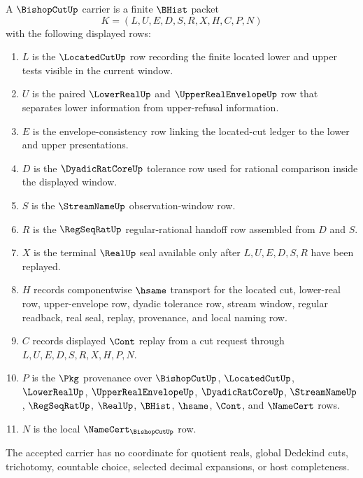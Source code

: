 \begin{definition}
\label{def:bishop-cut-carrier}
A $\BishopCutUp$ carrier is a finite $\BHist$ packet
$$
K=(L,U,E,D,S,R,X,H,C,P,N)
$$
with the following displayed rows:
\begin{enumerate}
\item $L$ is the $\LocatedCutUp$ row recording the finite located lower and upper tests visible in the current window.
\item $U$ is the paired $\LowerRealUp$ and $\UpperRealEnvelopeUp$ row that separates lower information from upper-refusal information.
\item $E$ is the envelope-consistency row linking the located-cut ledger to the lower and upper presentations.
\item $D$ is the $\DyadicRatCoreUp$ tolerance row used for rational comparison inside the displayed window.
\item $S$ is the $\StreamNameUp$ observation-window row.
\item $R$ is the $\RegSeqRatUp$ regular-rational handoff row assembled from $D$ and $S$.
\item $X$ is the terminal $\RealUp$ seal available only after $L,U,E,D,S,R$ have been replayed.
\item $H$ records componentwise $\hsame$ transport for the located cut, lower-real row, upper-envelope row, dyadic tolerance row, stream window, regular readback, real seal, replay, provenance, and local naming row.
\item $C$ records displayed $\Cont$ replay from a cut request through $L,U,E,D,S,R,X,H,P,N$.
\item $P$ is the $\Pkg$ provenance over $\BishopCutUp$, $\LocatedCutUp$, $\LowerRealUp$, $\UpperRealEnvelopeUp$, $\DyadicRatCoreUp$, $\StreamNameUp$, $\RegSeqRatUp$, $\RealUp$, $\BHist$, $\hsame$, $\Cont$, and $\NameCert$ rows.
\item $N$ is the local $\NameCert_{\BishopCutUp}$ row.
\end{enumerate}
The accepted carrier has no coordinate for quotient reals, global Dedekind cuts, trichotomy, countable choice, selected decimal expansions, or host completeness.
\end{definition}

